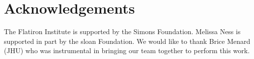 \documentclass[a4paper,fleqn,usenatbib]{mnras}
\begin{document}

\section*{Acknowledgements}

The Flatiron Institute is supported by the Simons Foundation.
Melissa Ness is supported in part by the sloan Foundation. We would like to thank Brice Menard (JHU) who was instrumental in bringing our team together to perform this work. 






\bsp	%
\label{lastpage}
\end{document}
